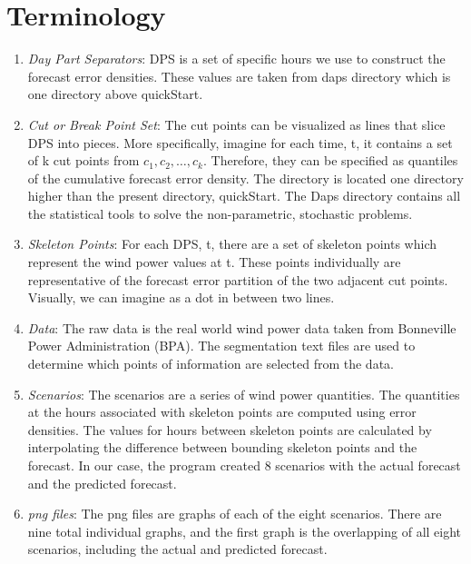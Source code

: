 \documentclass[12pt]{article}
\begin{document}
\section{Terminology}
\begin{enumerate} 
	\item\emph{Day Part Separators}: DPS is a set of specific hours we use to construct the forecast error densities. These values are taken from daps directory which is one directory above quickStart.
	\item \emph{Cut or Break Point Set}: The cut points can be visualized as lines that slice DPS into pieces. More specifically, imagine for each time, t, it contains a set of k cut points from $c_1, c_2, …, c_k$. Therefore, they can be specified as quantiles of the cumulative forecast error density. The directory is located one directory higher than the present directory, quickStart. The Daps directory contains all the statistical tools to solve the non-parametric, stochastic problems.  
	\item \emph{Skeleton Points}: For each DPS, t, there are a set of skeleton points which represent the wind power values at t. These points individually are representative of the forecast error partition of the two adjacent cut points. Visually, we can imagine as a dot in between two lines.
	\item\emph{Data}: The raw data is the real world wind power data taken from Bonneville Power Administration (BPA). The segmentation text files are used to determine which points of information are selected from the data. 
	\item\emph{Scenarios}: The scenarios are a series of wind power quantities. The quantities at the hours associated with skeleton points are computed using error densities. The values for hours between skeleton points are calculated by interpolating the difference between bounding skeleton points and the forecast. In our case, the program created 8 scenarios with the actual forecast and the predicted forecast.
	\item\emph{png files}: The png files are graphs of each of the eight scenarios. There are nine total individual graphs, and the first graph is the overlapping of all eight scenarios, including the actual and predicted forecast.
\end{enumerate}
\end{document}
